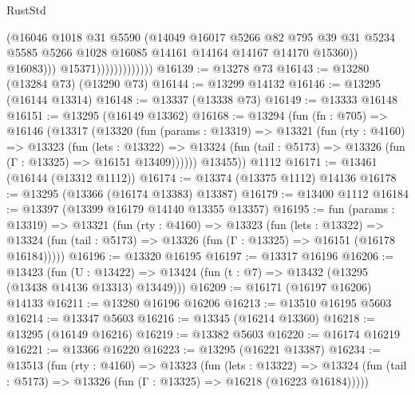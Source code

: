 \begin{lexlean}{RustStd}
\begin{coremodule}
                                    (@16046
                                      @1018
                                      @31
                                      @5590
                                      (@14049
                                        @16017
                                        @5266
                                        @82
                                        @795
                                        @39
                                        @31
                                        @5234
                                        @5585
                                        @5266
                                        @1028
                                        @16085
                                        @14161
                                        @14164
                                        @14167
                                        @14170
                                        @15360))
                                    @16083)))
                              @15371)))))))))))))
@16139 := @13278 @73
@16143 := @13280 (@13284 @73) (@13290 @73)
@16144 := @13299 @14132
@16146 := @13295 (@16144 @13314)
@16148 := @13337 (@13338 @73)
@16149 := @13333 @16148
@16151 := @13295 (@16149 @13362)
@16168 := @13294
    (fun (fn : @705) =>
    @16146
      (@13317
        (@13320
          (fun (params : @13319) =>
          @13321
            (fun (rty : @4160) =>
            @13323
              (fun (lets : @13322) =>
              @13324 (fun (tail : @5173) => @13326 (fun (Γ : @13325) => @16151 @13409))))))
        @13455))
    @1112
@16171 := @13461 (@16144 (@13312 @1112))
@16174 := @13374 (@13375 @1112) @14136
@16178 := @13295 (@13366 (@16174 @13383) @13387)
@16179 := @13400 @1112
@16184 := @13397 (@13399 @16179 @14140 @13355 @13357)
@16195 := fun (params : @13319) =>
  @13321
    (fun (rty : @4160) =>
    @13323
      (fun (lets : @13322) =>
      @13324 (fun (tail : @5173) => @13326 (fun (Γ : @13325) => @16151 (@16178 @16184)))))
@16196 := @13320 @16195
@16197 := @13317 @16196
@16206 := @13423
    (fun (U : @13422) => @13424 (fun (t : @7) => @13432 (@13295 (@13438 @14136 @13313) @13449)))
@16209 := @16171 (@16197 @16206) @14133
@16211 := @13280 @16196 @16206
@16213 := @13510 @16195 @5603
@16214 := @13347 @5603
@16216 := @13345 (@16214 @13360)
@16218 := @13295 (@16149 @16216)
@16219 := @13382 @5603
@16220 := @16174 @16219
@16221 := @13366 @16220
@16223 := @13295 (@16221 @13387)
@16234 := @13513
    (fun (rty : @4160) =>
    @13323
      (fun (lets : @13322) =>
      @13324 (fun (tail : @5173) => @13326 (fun (Γ : @13325) => @16218 (@16223 @16184)))))

\end{coremodule}
\end{lexlean}

